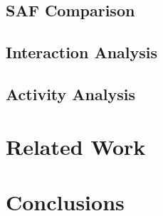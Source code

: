 \documentclass[letterpaper]{sig-alternte-cosn}
\begin{document}


\subsection{SAF Comparison}
\label{sec:saf_analysis}



\subsection{Interaction Analysis}
\label{sec:interaction_analysis}



\subsection{Activity Analysis}
\label{sec:activity_analysis}



\section{Related Work}



\section{Conclusions}





\end{document}

